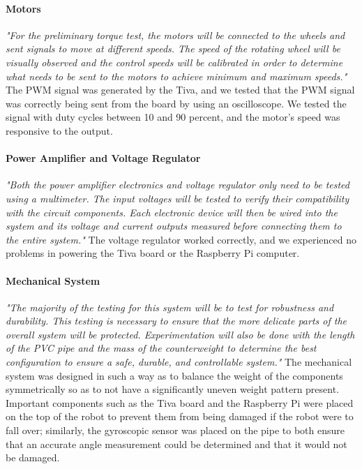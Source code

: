 \documentclass[11pt]{report}
\begin{document}
\begin{spacing}{1.5}
        \paragraph{Motors} \emph{"For the preliminary torque test, the motors will be connected to the wheels and sent signals to move at different speeds. The speed of the rotating wheel will be visually observed and the control speeds will be calibrated in order to determine what needs to be sent to the motors to achieve minimum and maximum speeds."} The PWM signal was generated by the Tiva, and we tested that the PWM signal was correctly being sent from the board by using an oscilloscope. We tested the signal with duty cycles between 10 and 90 percent, and the motor's speed was responsive to the output.
        
        \paragraph{Power Amplifier and Voltage Regulator} \emph{"Both the power amplifier electronics and voltage regulator only need to be tested using a multimeter. The input voltages will be tested to verify their compatibility with the circuit components. Each electronic device will then be wired into the system and its voltage and current outputs measured before connecting them to the entire system."} The voltage regulator worked correctly, and we experienced no problems in powering the Tiva board or the Raspberry Pi computer.
        
        \paragraph{Mechanical System} \emph{"The majority of the testing for this system will be to test for robustness and durability.  This testing is necessary to ensure that the more delicate parts of the overall system will be protected.  Experimentation will also be done with the length of the PVC pipe and the mass of the counterweight to determine the best configuration to ensure a safe, durable, and controllable system."} The mechanical system was designed in such a way as to balance the weight of the components symmetrically so as to not have a significantly uneven weight pattern present. Important components such as the Tiva board and the Raspberry Pi were placed on the top of the robot to prevent them from being damaged if the robot were to fall over; similarly, the gyroscopic sensor was placed on the pipe to both ensure that an accurate angle measurement could be determined and that it would not be damaged.
        


\end{spacing}
\end{document}
